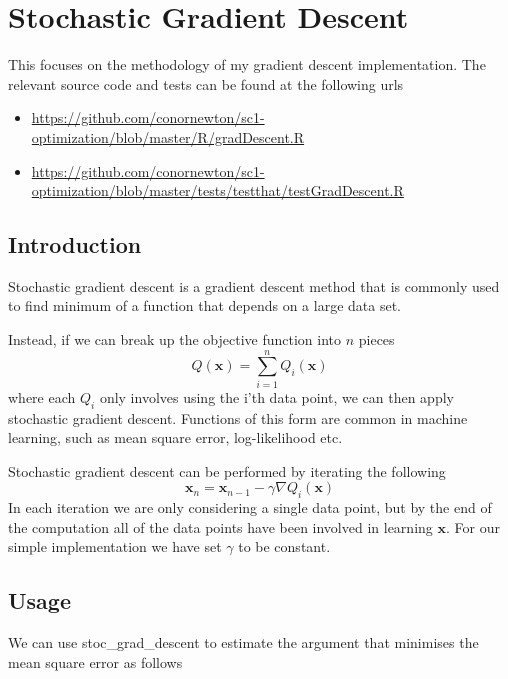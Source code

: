 \documentclass[12pt,]{article}
\providecommand{\tightlist}{%
  \setlength{\itemsep}{0pt}\setlength{\parskip}{0pt}}
\begin{document}
\hypertarget{stochastic-gradient-descent}{%
\section{Stochastic Gradient
Descent}\label{stochastic-gradient-descent}}

This focuses on the methodology of my gradient descent implementation.
The relevant source code and tests can be found at the following urls

\begin{itemize}
\tightlist
\item
  \url{https://github.com/conornewton/sc1-optimization/blob/master/R/gradDescent.R}
\item
  \url{https://github.com/conornewton/sc1-optimization/blob/master/tests/testthat/testGradDescent.R}
\end{itemize}

\hypertarget{introduction-1}{%
\subsection{Introduction}\label{introduction-1}}

Stochastic gradient descent is a gradient descent method that is
commonly used to find minimum of a function that depends on a large data
set.

Instead, if we can break up the objective function into \(n\) pieces \[
Q(\mathbf{x}) = \sum_{i=1}^nQ_i(\mathbf{x})
\] where each \(Q_i\) only involves using the i'th data point, we can
then apply stochastic gradient descent. Functions of this form are
common in machine learning, such as mean square error, log-likelihood
etc.

Stochastic gradient descent can be performed by iterating the following
\[
    \mathbf{x}_{n} = \mathbf{x}_{n-1} - \gamma \nabla Q_i(\mathbf{x})
\] In each iteration we are only considering a single data point, but by
the end of the computation all of the data points have been involved in
learning \(\mathbf{x}\). For our simple implementation we have set
\(\gamma\) to be constant.

\hypertarget{usage-1}{%
\subsection{Usage}\label{usage-1}}

We can use stoc\_grad\_descent to estimate the argument that minimises
the mean square error as follows
\end{document}
